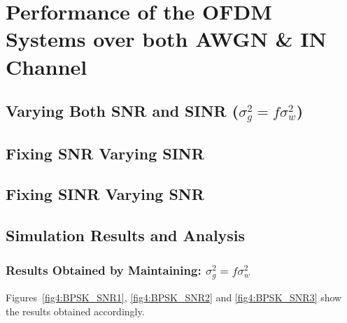 	\section{Performance of the OFDM Systems over both AWGN \& IN Channel} \label{sec4:performAWGN&IN}
		\subsection{Varying Both SNR and SINR ($\sigma_g^2=f\sigma_w^2$)}
		\subsection{Fixing SNR Varying SINR}
		\subsection{Fixing SINR Varying SNR}
		\subsection{Simulation Results and Analysis}
			\subsubsection{Results Obtained by Maintaining: $ \sigma_g^2=f\sigma_w^2 $} \label{subsec4:results1}
			 Figures~\ref{fig4:BPSK_SNR1}, \ref{fig4:BPSK_SNR2} and \ref{fig4:BPSK_SNR3} show the results obtained accordingly.
			
